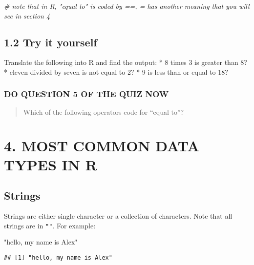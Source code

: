 \documentclass[
]{book}
\newenvironment{Shaded}{\begin{snugshade}}{\end{snugshade}}
\newcommand{\CommentTok}[1]{\textcolor[rgb]{0.56,0.35,0.01}{\textit{#1}}}
\newcommand{\StringTok}[1]{\textcolor[rgb]{0.31,0.60,0.02}{#1}}
\begin{document}
\begin{Shaded}
\begin{Highlighting}[]
    \CommentTok{\# note that in R, "equal to" is coded by ==, = has another meaning that you will see in section 4}
\end{Highlighting}
\end{Shaded}

\hypertarget{try-it-yourself-1}{%
\subsection{1.2 Try it yourself}\label{try-it-yourself-1}}

Translate the following into R and find the output:
* 8 times 3 is greater than 8?
* eleven divided by seven is not equal to 2?
* 9 is less than or equal to 18?

\hypertarget{do-question-5-of-the-quiz-now}{%
\subsubsection{DO QUESTION 5 OF THE QUIZ NOW}\label{do-question-5-of-the-quiz-now}}

\begin{quote}
Which of the following operators code for ``equal to''?
\end{quote}

\hypertarget{most-common-data-types-in-r}{%
\section{4. MOST COMMON DATA TYPES IN R}\label{most-common-data-types-in-r}}

\hypertarget{strings}{%
\subsection{Strings}\label{strings}}

Strings are either single character or a collection of characters. Note that all strings are in \texttt{""}. For example:

\begin{Shaded}
\begin{Highlighting}[]
\StringTok{"hello, my name is Alex"}
\end{Highlighting}
\end{Shaded}

\begin{verbatim}
## [1] "hello, my name is Alex"
\end{verbatim}
\end{document}
